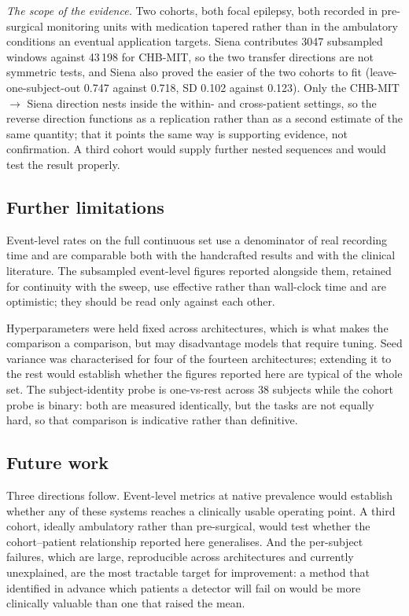 \documentclass[11pt,a4paper]{article}
\begin{document}
\emph{The scope of the evidence.} Two cohorts, both focal epilepsy, both
recorded in pre-surgical monitoring units with medication tapered rather
than in the ambulatory conditions an eventual application targets. Siena
contributes 3047 subsampled windows against 43\,198 for CHB-MIT, so the two
transfer directions are not symmetric tests, and Siena also proved the
easier of the two cohorts to fit (leave-one-subject-out 0.747 against 0.718,
SD 0.102 against 0.123). Only the CHB-MIT
$\rightarrow$ Siena direction nests inside the within- and cross-patient
settings, so the reverse direction functions as a replication rather than as
a second estimate of the same quantity; that it points the same way is
supporting evidence, not confirmation. A third cohort would supply further
nested sequences and would test the result properly.

\subsection{Further limitations}

Event-level rates on the full continuous set use a denominator of real
recording time and are comparable both with the handcrafted results and with
the clinical literature. The subsampled event-level figures reported
alongside them, retained for continuity with the sweep, use effective rather
than wall-clock time and are optimistic; they should be read only against
each other.

Hyperparameters were held fixed across architectures, which is what makes
the comparison a comparison, but may disadvantage models that require
tuning. Seed variance was characterised for four of the fourteen
architectures; extending it to the rest would establish whether the figures
reported here are typical of the whole set. The
subject-identity probe is one-vs-rest across 38 subjects while the cohort
probe is binary: both are measured identically, but the tasks are not
equally hard, so that comparison is indicative rather than definitive.

\subsection{Future work}

Three directions follow. Event-level metrics at native prevalence would
establish whether any of these systems reaches a clinically usable operating
point. A third cohort, ideally ambulatory rather than pre-surgical, would test
whether the cohort--patient relationship reported here generalises. And the
per-subject failures, which are large, reproducible across architectures and
currently unexplained, are the most tractable target for improvement: a method
that identified in advance which patients a detector will fail on would be
more clinically valuable than one that raised the mean.
\end{document}
